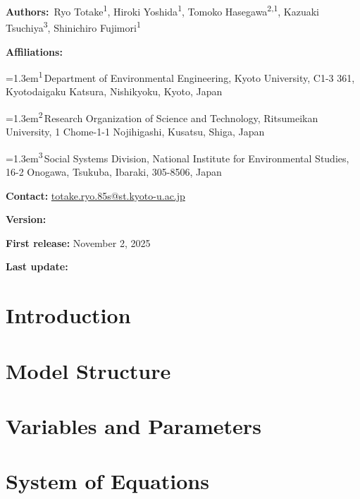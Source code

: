 \documentclass[11pt,a4paper,headings=small,parskip=half]{scrartcl}
\numberwithin{equation}{section}
\newcommand{\affilmark}[1]{\textsuperscript{#1}}
\newcommand{\affil}[2]{%
  \par\hangindent=1.3em\noindent\textsuperscript{#1}\,#2%
}
\begin{document}
{\small
\textbf{Authors:}\ 
Ryo Totake\affilmark{1},
Hiroki Yoshida\affilmark{1},
Tomoko Hasegawa\affilmark{2,1},
Kazuaki Tsuchiya\affilmark{3},
Shinichiro Fujimori\affilmark{1}\par

\textbf{Affiliations:}
\affil{1}{Department of Environmental Engineering, Kyoto University, C1-3 361, Kyotodaigaku Katsura, Nishikyoku, Kyoto, Japan}
\affil{2}{Research Organization of Science and Technology, Ritsumeikan University, 1 Chome-1-1 Nojihigashi, Kusatsu, Shiga, Japan}
\affil{3}{Social Systems Division, National Institute for Environmental Studies, 16-2 Onogawa, Tsukuba, Ibaraki, 305-8506, Japan}\par
\textbf{Contact:} \href{mailto:totake.ryo.85s@st.kyoto-u.ac.jp}{totake.ryo.85s@st.kyoto-u.ac.jp}\par
\textbf{Version:} \docversion\par 
\textbf{First release:} November 2, 2025\par
\textbf{Last update:} \docdate\par
}

\clearpage

\clearpage
\tableofcontents
\clearpage

\section{Introduction}\label{sec:intro}


\section{Model Structure}\label{sec:structure}


\section{Variables and Parameters}\label{sec:variables}


\section{System of Equations}\label{sec:equations}

\end{document}

